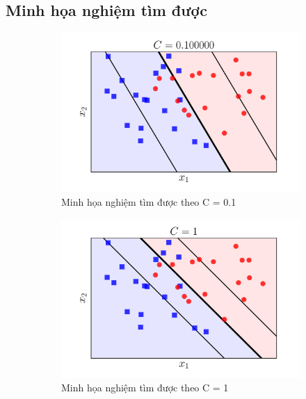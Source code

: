 \documentclass[a4paper, 12pt, oneside]{report}
\begin{document}
\subsection{Minh họa nghiệm tìm được}
\begin{figure}[H]
     \centering
     \begin{subfigure}[H]{0.3\textwidth}
         \centering
         \includegraphics[width=\textwidth]{ssvm5_01.png}
         \caption{Minh họa nghiệm tìm được theo C = 0.1}
         \label{refhinh1}
     \end{subfigure}
     \hfill
     \begin{subfigure}[H]{0.3\textwidth}
         \centering
         \includegraphics[width=\textwidth]{ssvm5_1.png}
         \caption{Minh họa nghiệm tìm được theo C = 1}
         \label{refhinh1}
     \end{subfigure}
     \hfill
     \begin{subfigure}[H]{0.3\textwidth}

\end{subfigure}
\end{figure}
\end{document}
